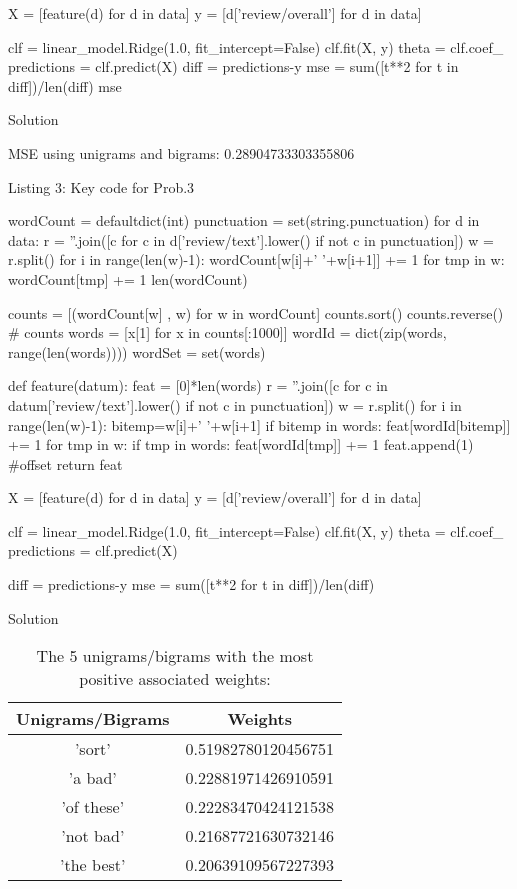 \documentclass{assignment}
\begin{document}
\begin{problemlist}
\begin{python}
X = [feature(d) for d in data]
y = [d['review/overall'] for d in data]

clf = linear_model.Ridge(1.0, fit_intercept=False)
clf.fit(X, y)
theta = clf.coef_
predictions = clf.predict(X)
diff = predictions-y
mse = sum([t**2 for t in diff])/len(diff)
mse
\end{python}

\pbitem Solution

MSE using unigrams and bigrams: 0.28904733303355806

\begin{center} 
Listing 3: Key code for Prob.3
\end{center}
\begin{python}
wordCount = defaultdict(int)
punctuation = set(string.punctuation)
for d in data:
  r = ''.join([c for c in d['review/text'].lower() if not c in punctuation])
  w = r.split()
  for i in range(len(w)-1):
    wordCount[w[i]+' '+w[i+1]] += 1
  for tmp in w:
    wordCount[tmp] += 1
len(wordCount)

counts = [(wordCount[w] , w) for w in wordCount]
counts.sort()
counts.reverse()
# counts
words = [x[1] for x in counts[:1000]]
wordId = dict(zip(words, range(len(words))))
wordSet = set(words)

def feature(datum):
  feat = [0]*len(words)
  r = ''.join([c for c in datum['review/text'].lower() if not c in punctuation])
  w = r.split()
  for i in range(len(w)-1):
    bitemp=w[i]+' '+w[i+1]
    if bitemp in words:
      feat[wordId[bitemp]] += 1
  for tmp in w:
    if tmp in words:
      feat[wordId[tmp]] += 1
  feat.append(1) #offset
  return feat

X = [feature(d) for d in data]
y = [d['review/overall'] for d in data]

clf = linear_model.Ridge(1.0, fit_intercept=False)
clf.fit(X, y)
theta = clf.coef_
predictions = clf.predict(X)

diff = predictions-y
mse = sum([t**2 for t in diff])/len(diff)
\end{python}

\pbitem Solution

\begin{table}[h]
\vspace{2ex}
\centering
\caption{The 5 unigrams/bigrams with the most positive associated weights:}
\vspace{1ex}

\begin{tabular}{|c|c|}
\hline
Unigrams/Bigrams & Weights \\
\hline
'sort' & 0.51982780120456751\\
\hline
'a bad' & 0.22881971426910591 \\
\hline
'of these' & 0.22283470424121538 \\
\hline
'not bad' & 0.21687721630732146 \\
\hline
'the best' & 0.20639109567227393 \\
\hline
\end{tabular}
\end{table}


\end{problemlist}
\end{document}
